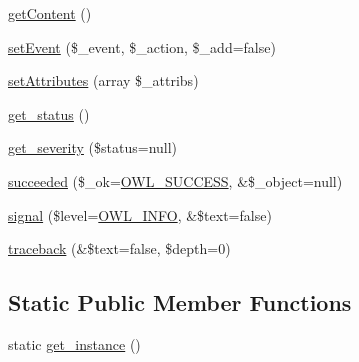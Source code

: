 \begin{DoxyCompactItemize}
\item 
\hyperlink{classBaseElement_af8c86b93bcdcfbc415bf96c622dc5516}{getContent} ()
\item 
\hyperlink{classBaseElement_ad5789f45f16aaa144716ee8558069c31}{setEvent} (\$\_\-event, \$\_\-action, \$\_\-add=false)
\item 
\hyperlink{classBaseElement_a7d8ddd64ceb3401a7cb84548656b3709}{setAttributes} (array \$\_\-attribs)
\item 
\hyperlink{class__OWL_a99ec771fa2c5c279f80152cc09e489a8}{get\_\-status} ()
\item 
\hyperlink{class__OWL_adf9509ef96858be7bdd9414c5ef129aa}{get\_\-severity} (\$status=null)
\item 
\hyperlink{class__OWL_a53ab4d3bbb2c6a56966c339ca4b4c805}{succeeded} (\$\_\-ok=\hyperlink{owl_8severitycodes_8php_a96223f06ba27bf5cbefa6e9d702897c2}{OWL\_\-SUCCESS}, \&\$\_\-object=null)
\item 
\hyperlink{class__OWL_a51ba4a16409acf2a2f61f286939091a5}{signal} (\$level=\hyperlink{owl_8severitycodes_8php_a139328861128689f2f4def6a399d9057}{OWL\_\-INFO}, \&\$text=false)
\item 
\hyperlink{class__OWL_aa29547995d6741b7d2b90c1d4ea99a13}{traceback} (\&\$text=false, \$depth=0)
\end{DoxyCompactItemize}
\subsection*{Static Public Member Functions}
\begin{DoxyCompactItemize}
\item 
static \hyperlink{classDocument_a840881b31974bd6f307fd6dcf73bc9c3}{get\_\-instance} ()
\end{DoxyCompactItemize}
